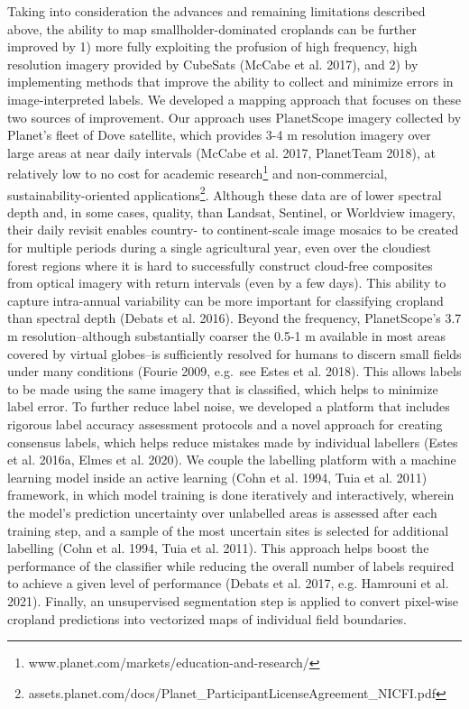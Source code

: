 \documentclass[11pt,a4paper]{article}
\begin{document}
Taking into consideration the advances and remaining limitations
described above, the ability to map smallholder-dominated croplands can
be further improved by 1) more fully exploiting the profusion of high
frequency, high resolution imagery provided by CubeSats (McCabe et al.
2017), and 2) by implementing methods that improve the ability to
collect and minimize errors in image-interpreted labels. We developed a
mapping approach that focuses on these two sources of improvement. Our
approach uses PlanetScope imagery collected by Planet's fleet of Dove
satellite, which provides 3-4 m resolution imagery over large areas at
near daily intervals (McCabe et al. 2017, PlanetTeam 2018), at
relatively low to no cost for academic
research\footnote{www.planet.com/markets/education-and-research/} and
non-commercial, sustainability-oriented
applications\footnote{assets.planet.com/docs/Planet\_ParticipantLicenseAgreement\_NICFI.pdf}.
Although these data are of lower spectral depth and, in some cases,
quality, than Landsat, Sentinel, or Worldview imagery, their daily
revisit enables country- to continent-scale image mosaics to be created
for multiple periods during a single agricultural year, even over the
cloudiest forest regions where it is hard to successfully construct
cloud-free composites from optical imagery with return intervals (even
by a few days). This ability to capture intra-annual variability can be
more important for classifying cropland than spectral depth (Debats et
al. 2016). Beyond the frequency, PlanetScope's 3.7 m
resolution--although substantially coarser the 0.5-1 m available in most
areas covered by virtual globes--is sufficiently resolved for humans to
discern small fields under many conditions (Fourie 2009, e.g.~see Estes
et al. 2018). This allows labels to be made using the same imagery that
is classified, which helps to minimize label error. To further reduce
label noise, we developed a platform that includes rigorous label
accuracy assessment protocols and a novel approach for creating
consensus labels, which helps reduce mistakes made by individual
labellers (Estes et al. 2016a, Elmes et al. 2020). We couple the
labelling platform with a machine learning model inside an active
learning (Cohn et al. 1994, Tuia et al. 2011) framework, in which model
training is done iteratively and interactively, wherein the model's
prediction uncertainty over unlabelled areas is assessed after each
training step, and a sample of the most uncertain sites is selected for
additional labelling (Cohn et al. 1994, Tuia et al. 2011). This approach
helps boost the performance of the classifier while reducing the overall
number of labels required to achieve a given level of performance
(Debats et al. 2017, e.g. Hamrouni et al. 2021). Finally, an
unsupervised segmentation step is applied to convert pixel-wise cropland
predictions into vectorized maps of individual field boundaries.
\end{document}
